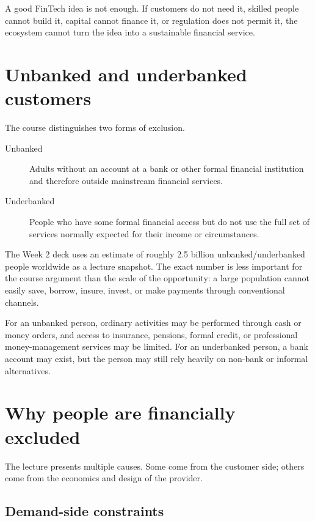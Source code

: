 \begin{intuition}
A good FinTech idea is not enough. If customers do not need it, skilled people cannot build it, capital cannot finance it, or regulation does not permit it, the ecosystem cannot turn the idea into a sustainable financial service.
\end{intuition}

\section{Unbanked and underbanked customers}

The course distinguishes two forms of exclusion.

\begin{description}
  \item[Unbanked] Adults without an account at a bank or other formal financial institution and therefore outside mainstream financial services.
  \item[Underbanked] People who have some formal financial access but do not use the full set of services normally expected for their income or circumstances.
\end{description}

The Week 2 deck uses an estimate of roughly 2.5 billion unbanked/underbanked people worldwide as a lecture snapshot. The exact number is less important for the course argument than the scale of the opportunity: a large population cannot easily save, borrow, insure, invest, or make payments through conventional channels.

For an unbanked person, ordinary activities may be performed through cash or money orders, and access to insurance, pensions, formal credit, or professional money-management services may be limited. For an underbanked person, a bank account may exist, but the person may still rely heavily on non-bank or informal alternatives.

\section{Why people are financially excluded}

The lecture presents multiple causes. Some come from the customer side; others come from the economics and design of the provider.

\subsection{Demand-side constraints}

